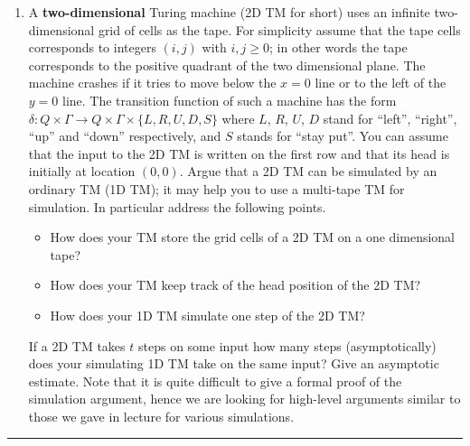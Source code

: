 \documentclass[11pt]{article}
\begin{document}

\begin{enumerate}[1.]
\item A {\bf two-dimensional} Turing machine (2D TM for short) uses an infinite
  two-dimensional grid of cells as the tape. For simplicity assume
  that the tape cells corresponds to integers $(i,j)$ with $i,j \ge 0$;
  in other words the tape corresponds to the positive quadrant of the
  two dimensional plane. The machine crashes if it tries to move below
  the $x=0$ line or to the left of the $y=0$ line.  The transition
  function of such a machine has the form
  $\delta: Q \times \Gamma \rightarrow Q \times \Gamma \times
  \{L,R,U,D,S\}$ where $L$, $R$, $U$, $D$ stand for ``left'',
  ``right'', ``up'' and ``down'' respectively, and $S$ stands for
  ``stay put''. You can assume that the input to the 2D TM is written
  on the first row and that its head is initially at location $(0,0)$.
  Argue that a 2D TM can be simulated by an
  ordinary TM (1D TM); it may help you to use a multi-tape TM for
  simulation. In particular address the following points.
  \begin{itemize}
  \item How does your TM store the grid cells of a 2D TM on a one dimensional
    tape?
  \item How does your TM keep track of the head position of the
    2D TM?
  \item How does your 1D TM simulate one step of the
    2D TM?
  \end{itemize}
  If a 2D TM takes $t$ steps on some input how many steps
  (asymptotically) does your simulating 1D TM take on the same input?
  Give an asymptotic estimate. Note that it is quite difficult to give
  a formal proof of the simulation argument, hence we are looking for
  high-level arguments similar to those we gave in lecture for various
  simulations.

\end{enumerate}
\hrule
\end{document}
